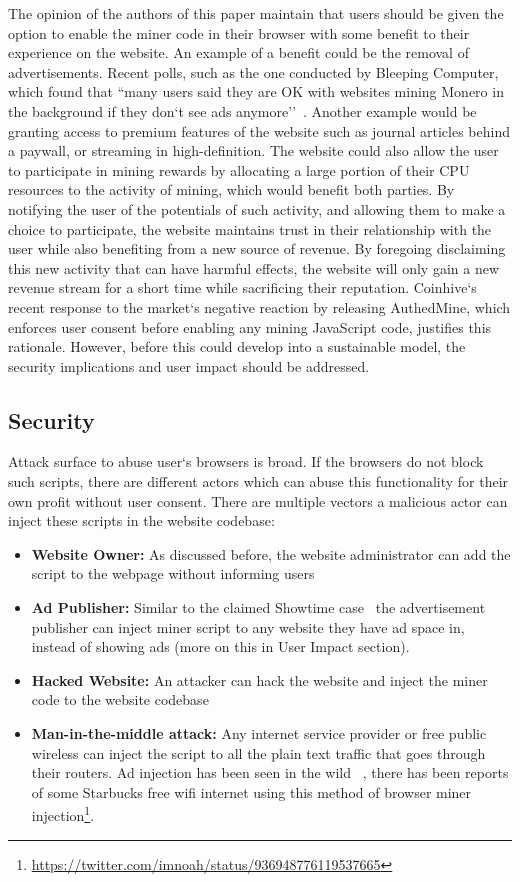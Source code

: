 The opinion of the authors of this paper maintain that users should be given the option to enable the miner code in their browser with some benefit to their experience on the website.  An example of a benefit could be the removal of advertisements. Recent polls, such as the one conducted by Bleeping Computer, which found that ``many users said they are OK with websites mining Monero in the background if they don`t see ads anymore''~\cite{bleepingcomputerminers}. Another example would be granting access to premium features of the website such as journal articles behind a paywall, or streaming in high-definition. The website could also allow the user to participate in mining rewards by allocating a large portion of their CPU resources to the activity of mining, which would benefit both parties. By notifying the user of the potentials of such activity, and allowing them to make a choice to participate, the website maintains trust in their relationship with the user while also benefiting from a new source of revenue. By foregoing disclaiming this new activity that can have harmful effects, the website will only gain a new revenue stream for a short time while sacrificing their reputation. Coinhive`s recent response to the market`s negative reaction by releasing AuthedMine, which enforces user consent before enabling any mining JavaScript code, justifies this rationale. However, before this could develop into a sustainable model, the security implications and user impact should be addressed.

\subsection{Security}
Attack surface to abuse user`s browsers is broad. If the browsers do not block such scripts, there are different actors which can abuse this functionality for their own profit without user consent. There are multiple vectors a malicious actor can inject these scripts in the website codebase:
\begin{itemize}
\item \textbf{Website Owner:} As discussed before, the website administrator can add the script to the webpage without informing users
\item \textbf{Ad Publisher:} Similar to the claimed Showtime case~\cite{showtimehive} the advertisement publisher can inject miner script to any website they have ad space in, instead of showing ads (more on this in User Impact section).
\item \textbf{Hacked Website:} An attacker can hack the website and inject the miner code to the website codebase
\item \textbf{Man-in-the-middle attack:} Any internet service provider or free public wireless can inject the script to all the plain text traffic that goes through their routers. Ad injection has been seen in the wild ~\cite{vergeadinjection}, there has been reports of some Starbucks free wifi internet using this method of browser miner injection\footnote{\url{https://twitter.com/imnoah/status/936948776119537665}}.
\end{itemize}

